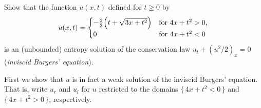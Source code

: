 \begin{problem}
  Show that the function \(u(x,t)\) defined for \(t\geq 0\) by
  \[
    u(x,t)=
    \begin{cases}
      -\tfrac{2}{3}\Bigl(t+\sqrt{3x+t^2}\Bigr)
      &\text{for \(4x+t^2>0\),}\\
      0
      &\text{for \(4x+t^2<0\)}
    \end{cases}
  \]
  is an (unbounded) entropy solution of the conservation law
  \(u_t+(u^2/2)_x=0\) (\emph{inviscid Burgers' equation}).
\end{problem}
\begin{solution*}
  First we show that \(u\) is in fact a weak solution of the inviscid
  Burgers' equation. That is, write \(u_r\) and \(u_l\) for \(u\)
  restricted to the domains \(\{\,4x+t^2<0\,\}\) and \(\{\,4x+t^2>0\,\}\),
  respectively.
\end{solution*}

